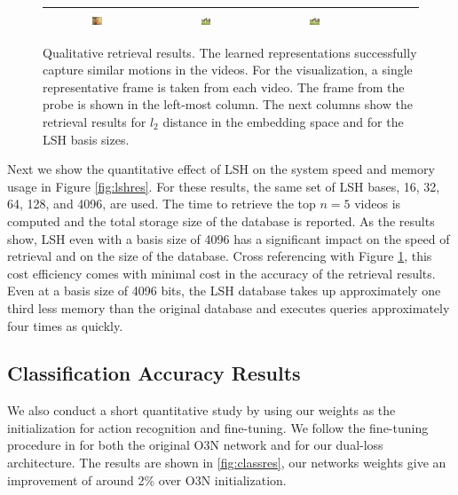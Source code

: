 \begin{figure}[t]
\begin{center}
\begin{tabular}{|c|c|ccccc|}
          \includegraphics[width=0.1\textwidth]{images/ret_results/writing/64.png} & 
          \includegraphics[width=0.1\textwidth]{images/ret_results/writing/128.png} & 
          \includegraphics[width=0.1\textwidth]{images/ret_results/writing/4096.png} \\ \hline            
        \end{tabular}
        \caption{Qualitative retrieval results. The learned representations successfully capture similar motions in the videos. For the visualization, a single representative frame is taken from each video. The frame from the probe is shown in the left-most column. The next columns show the retrieval results for $l_2$ distance in the embedding space and for the LSH basis sizes.  }
        \label{fig:retres}
    \end{center}
\end{figure}

Next we show the quantitative effect of LSH on the system speed and memory usage in Figure \ref{fig:lshres}. For these results, the same set of LSH bases, 16, 32, 64, 128, and 4096, are used. The time to retrieve the top $n=5$ videos is computed and the total storage size of the database is reported. As the results show, LSH even with a basis size of 4096 has a significant impact on the speed of retrieval and on the size of the database. Cross referencing with Figure \ref{fig:retres}, this cost efficiency comes with minimal cost in the accuracy of the retrieval results. Even at a basis size of 4096 bits, the LSH database takes up approximately one third less memory than the original database and executes queries approximately four times as quickly.

\subsection{Classification Accuracy Results}

We also conduct a short quantitative study by using our weights as the initialization for action recognition and fine-tuning. We follow the fine-tuning procedure in \cite{fernando2017self} for both the original O3N network and for our dual-loss architecture. The results are shown in \ref{fig:classres}, our networks weights give an improvement of around 2\% over O3N initialization.

